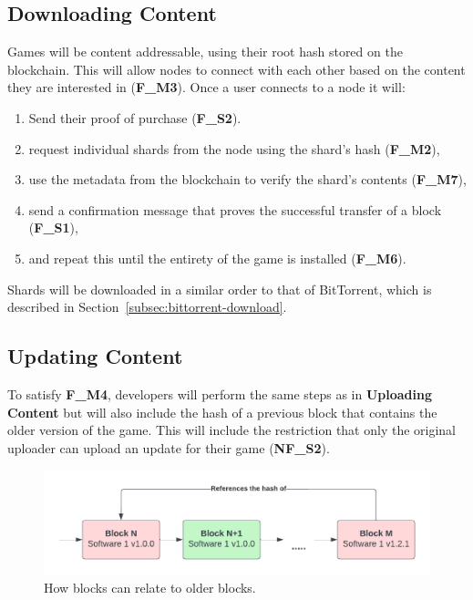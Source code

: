 \subsection*{Downloading Content}

Games will be content addressable, using their root hash stored on the blockchain. This will allow nodes to connect with each other based on the content they are interested in (\textbf{F\_M3}). Once a user connects to a node it will:

\begin{enumerate}
  \item Send their proof of purchase (\textbf{F\_S2}).
  \item request individual shards from the node using the shard's hash (\textbf{F\_M2}),
  \item use the metadata from the blockchain to verify the shard's contents (\textbf{F\_M7}),
  \item send a confirmation message that proves the successful transfer of a block (\textbf{F\_S1}), 
  \item and repeat this until the entirety of the game is installed (\textbf{F\_M6}).
\end{enumerate}

\noindent Shards will be downloaded in a similar order to that of BitTorrent, which is described in Section~\ref{subsec:bittorrent-download}.

\subsection*{Updating Content}

To satisfy \textbf{F\_M4}, developers will perform the same steps as in \textbf{Uploading Content} but will also include the hash of a previous block that contains the older version of the game. This will include the restriction that only the original uploader can upload an update for their game (\textbf{NF\_S2}).

\begin{figure}[ht]
  \centering
  \includegraphics[width=.85\textwidth]{assets/images/diagrams/update-software.png}
  \caption{How blocks can relate to older blocks.}
\end{figure}

